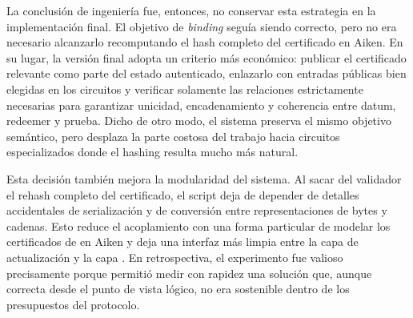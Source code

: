 La conclusión de ingeniería fue, entonces, no conservar esta estrategia en la implementación final. El objetivo de \textit{binding} seguía siendo correcto, pero no era necesario alcanzarlo recomputando el hash completo del certificado en Aiken. En su lugar, la versión final adopta un criterio más económico: publicar el certificado relevante como parte del estado autenticado, enlazarlo con entradas públicas bien elegidas en los circuitos y verificar \Onchain solamente las relaciones estrictamente necesarias para garantizar unicidad, encadenamiento y coherencia entre datum, redeemer y prueba. Dicho de otro modo, el sistema preserva el mismo objetivo semántico, pero desplaza la parte costosa del trabajo hacia circuitos especializados donde el hashing resulta mucho más natural.

Esta decisión también mejora la modularidad del sistema. Al sacar del validador el rehash completo del certificado, el script deja de depender de detalles accidentales de serialización y de conversión entre representaciones de bytes y cadenas. Esto reduce el acoplamiento con una forma particular de modelar los certificados de \Mithril en Aiken y deja una interfaz más limpia entre la capa de actualización y la capa \ZK. En retrospectiva, el experimento fue valioso precisamente porque permitió medir con rapidez una solución que, aunque correcta desde el punto de vista lógico, no era sostenible dentro de los presupuestos del protocolo.
